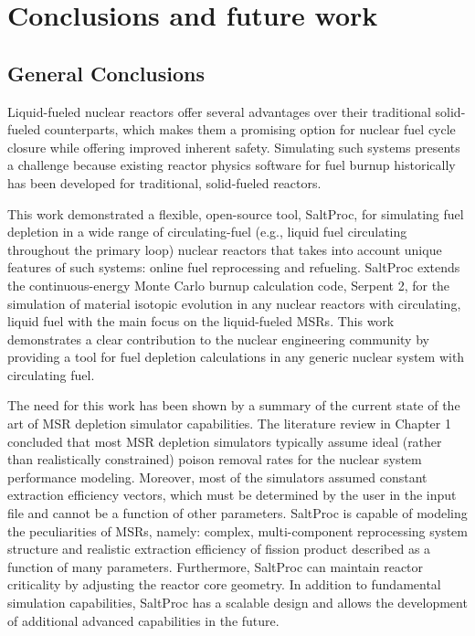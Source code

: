 \chapter{Conclusions and future work}

\section{General Conclusions}
Liquid-fueled nuclear reactors offer several advantages over their traditional 
solid-fueled counterparts, which makes them a promising option for nuclear 
fuel cycle closure while offering improved inherent safety. Simulating such 
systems presents a challenge because existing reactor physics software for 
fuel burnup historically has been developed for traditional, solid-fueled 
reactors.

This work demonstrated a flexible, open-source tool, SaltProc, for 
simulating fuel depletion in a wide range of circulating-fuel (e.g., liquid 
fuel circulating throughout the primary loop) nuclear reactors that takes into 
account unique features of such systems: online fuel reprocessing 
and refueling. SaltProc extends the continuous-energy Monte Carlo burnup 
calculation code, Serpent 2, for the simulation of material isotopic evolution 
in any nuclear reactors with circulating, liquid fuel with the main focus on 
the liquid-fueled \glspl{MSR}. This work demonstrates a clear contribution to 
the nuclear engineering community by providing a tool for fuel depletion 
calculations in any generic nuclear system with circulating fuel.

The need for this work has been shown by a summary of the current state of the 
art of \gls{MSR} depletion simulator capabilities. The literature review in 
Chapter 1 concluded that most \gls{MSR} depletion simulators typically assume 
ideal (rather than realistically constrained) poison removal rates for the 
nuclear system performance modeling. Moreover, most of the simulators assumed 
constant extraction efficiency vectors, which must be determined by the user 
in the input file and cannot be a function of other parameters. SaltProc is 
capable of modeling the peculiarities of \glspl{MSR}, namely:
complex, multi-component reprocessing system structure and realistic 
extraction efficiency of fission product described as a function of 
many parameters. Furthermore, SaltProc can maintain reactor criticality by 
adjusting the reactor core geometry. In addition to fundamental simulation 
capabilities, SaltProc has a scalable design and allows the development of 
additional advanced capabilities in the future. 

